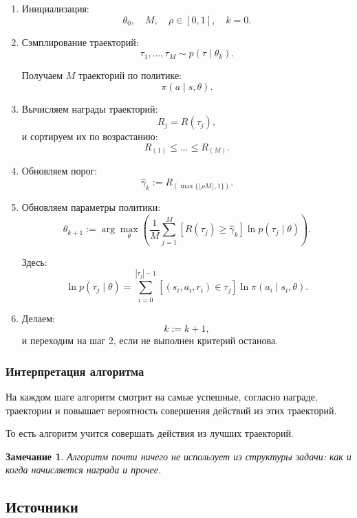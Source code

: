 \documentclass[12pt,a4paper]{article}
\newtheorem{remark}{Замечание}
\begin{document}
\begin{enumerate}
    \item Инициализация:
    \[
    \theta_0,\quad M,\quad \rho \in [0,1],\quad k=0.
    \]

    \item Сэмплирование траекторий:
    \[
    \tau_1,\ldots,\tau_M
    \sim
    p(\tau \mid \theta_k).
    \]

    Получаем $M$ траекторий по политике:
    \[
    \pi(a \mid s,\theta).
    \]

    \item Вычисляем награды траекторий:
    \[
    R_j = R(\tau_j),
    \]
    и сортируем их по возрастанию:
    \[
    R_{(1)} \le \ldots \le R_{(M)}.
    \]

    \item Обновляем порог:
    \[
    \hat\gamma_k
    :=
    R_{(\max\{\lfloor \rho M \rfloor,1\})}.
    \]

    \item Обновляем параметры политики:
    \[
    \theta_{k+1}
    :=
    \arg\max_{\theta}
    \left(
    \frac{1}{M}
    \sum_{j=1}^{M}
    \left[
    R(\tau_j) \ge \hat\gamma_k
    \right]
    \ln p(\tau_j \mid \theta)
    \right).
    \]

    Здесь:
    \[
    \ln p(\tau_j \mid \theta)
    =
    \sum_{i=0}^{|\tau_j|-1}
    \left[
    (s_i,a_i,r_i) \in \tau_j
    \right]
    \ln \pi(a_i \mid s_i,\theta).
    \]

    \item Делаем:
    \[
    k := k+1,
    \]
    и переходим на шаг 2, если не выполнен критерий останова.
\end{enumerate}

\subsubsection{Интерпретация алгоритма}

На каждом шаге алгоритм смотрит на самые успешные, согласно награде, траектории и повышает вероятность совершения действий из этих траекторий.

То есть алгоритм учится совершать действия из лучших траекторий.

\begin{remark}
Алгоритм почти ничего не использует из структуры задачи: как и когда начисляется награда и прочее.
\end{remark}

\subsection{Источники}
\end{document}
